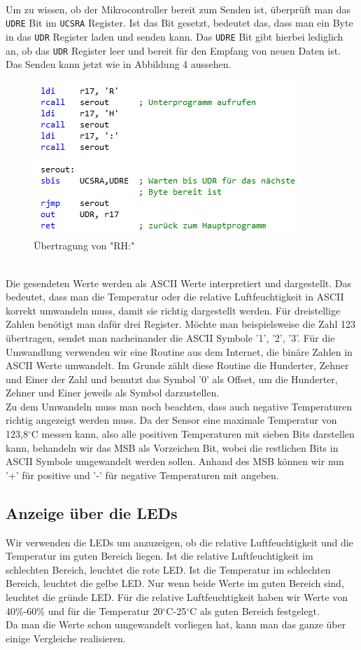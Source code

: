 \documentclass[]{article}
\begin{document}
\\Um zu wissen, ob der Mikrocontroller bereit zum Senden ist, überprüft man das \texttt{UDRE} Bit im \texttt{UCSRA} Register. Ist das Bit gesetzt, bedeutet das, dass man ein Byte in das \texttt{UDR} Register laden und senden kann. Das \texttt{UDRE} Bit gibt hierbei lediglich an, ob das \texttt{UDR} Register leer und bereit für den Empfang von neuen Daten ist. Das Senden kann jetzt wie in Abbildung 4 aussehen.
\begin{figure}[h]
	\centering
	\includegraphics[width=0.6\columnwidth]{UART.png}
	\caption{Übertragung von "RH:"}
\end{figure}
\\Die gesendeten Werte werden als ASCII Werte interpretiert und dargestellt. Das bedeutet, dass man die Temperatur oder die relative Luftfeuchtigkeit in ASCII korrekt umwandeln muss, damit sie richtig dargestellt werden. Für dreistellige Zahlen benötigt man dafür drei Register. Möchte man beispielsweise die Zahl 123 übertragen, sendet man nacheinander die ASCII Symbole '1', '2', '3'. Für die Umwandlung verwenden wir eine Routine aus dem Internet, die binäre Zahlen in ASCII Werte umwandelt. Im Grunde zählt diese Routine die Hunderter, Zehner und Einer der Zahl und benutzt das Symbol '0' als Offset, um die Hunderter, Zehner und Einer jeweils als Symbol darzustellen.
\\Zu dem Umwandeln muss man noch beachten, dass auch negative Temperaturen richtig angezeigt werden muss. Da der Sensor eine maximale Temperatur von 123,8$^\circ$C messen kann, also alle positiven Temperaturen mit sieben Bits darstellen kann, behandeln wir das MSB als Vorzeichen Bit, wobei die restlichen Bits in ASCII Symbole umgewandelt werden sollen. Anhand des MSB können wir nun '+' für positive und '-' für negative Temperaturen mit angeben.

\subsection{Anzeige über die LEDs}
Wir verwenden die LEDs um anzuzeigen, ob die relative Luftfeuchtigkeit und die Temperatur im guten Bereich liegen. Ist die relative Luftfeuchtigkeit im schlechten Bereich, leuchtet die rote LED. Ist die Temperatur im schlechten Bereich, leuchtet die gelbe LED. Nur wenn beide Werte im guten Bereich sind, leuchtet die gründe LED. Für die relative Luftfeuchtigkeit haben wir Werte von 40\%-60\% und für die Temperatur 20$^\circ$C-25$^\circ$C als guten Bereich festgelegt.
\\Da man die Werte schon umgewandelt vorliegen hat, kann man das ganze über einige Vergleiche realisieren.
\end{document}

